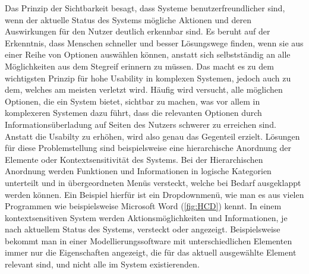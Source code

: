Das Prinzip der Sichtbarkeit besagt, dass Systeme benutzerfreundlicher sind, wenn der aktuelle Status des Systems mögliche Aktionen und deren Auswirkungen für den Nutzer deutlich erkennbar sind.
Es beruht auf der Erkenntnis, dass Menschen schneller und besser Lösungswege finden, wenn sie aus einer Reihe von Optionen auswählen können, anstatt sich selbstständig an alle Möglichkeiten aus dem Stegreif erinnern zu müssen\cite{Lidwell.2010}.
Das macht es zu dem wichtigsten Prinzip für hohe Usability in komplexen Systemen, jedoch auch zu dem, welches am meisten verletzt wird\cite{Norman.2016}.
Häufig wird versucht, alle möglichen Optionen, die ein System bietet, sichtbar zu machen, was vor allem in komplexeren Systemen dazu führt, dass die relevanten Optionen durch Informationsüberladung auf Seiten des Nutzers schwerer zu erreichen sind. 
Anstatt die Usabilty zu erhöhen, wird also genau das Gegenteil erzielt.
Lösungen für diese Problemstellung sind beispielsweise eine hierarchische Anordnung der Elemente oder Kontextsensitivität des Systems.
Bei der Hierarchischen Anordnung werden Funktionen und Informationen in logische Kategorien unterteilt und in übergeordneten Menüs versteckt, welche bei Bedarf ausgeklappt werden können.
Ein Beispiel hierfür ist ein Dropdownmenü, wie man es aus vielen Programmen wie beispielsweise Microsoft Word (\cref{fig:HCD}) kennt.
In einem kontextsensitiven System werden Aktionsmöglichkeiten und Informationen, je nach aktuellem Status des Systems, versteckt oder angezeigt. Beispielsweise bekommt man in einer Modellierungssoftware mit unterschiedlichen Elementen immer nur die Eigenschaften angezeigt, die für das aktuell ausgewählte Element relevant sind, und nicht alle im System existierenden\cite{Lidwell.2010}.

